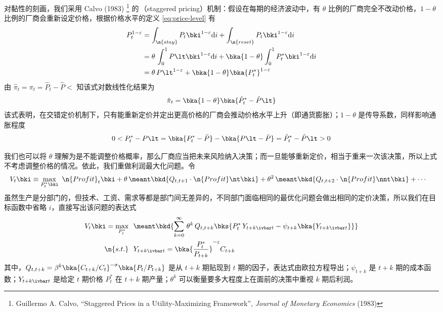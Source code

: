 对黏性的刻画，我们采用 Calvo (1983) \footnote{Guillermo A. Calvo, ``Staggered Prices in a Utility-Maximizing Framework'', \emph{Journal of Monetary Economics} (1983)} 的\,（staggered pricing）机制：假设在每期的经济波动中，有 \(\theta\) 比例的厂商完全不改动价格，\(1-\theta\) 比例的厂商会重新设定价格，根据价格水平的定义 \ref{eq:price-level} 有
\begin{align*}
    P_t^{1-\varepsilon}&=\int_{\n{stay}} P_t\bki^{1-\varepsilon}\mathrm di+\int_{\n{reset}} P_t\bki^{1-\varepsilon}\mathrm di\\&=\theta\,\int^1_0 P\lt\bki^{1-\varepsilon}\mathrm di+\bka{1-\theta}\int^1_0 P_t^*\bki^{1-\varepsilon}\mathrm di\\&=\theta\,P\lt^{1-\varepsilon}+\bka{1-\theta}\bka{P_t^*}^{1-\varepsilon}
\end{align*}
由 \(\hat\pi_t=\pi_t=\hat P_t-\hat P\lt\) 知该式对数线性化结果为
\begin{align*}
    \hat\pi_t=\bka{1-\theta}\bka{\hat P^*_t-\hat P\lt}
\end{align*}
该式表明，在交错定价机制下，只有能重新定价并定出更高价格的厂商会推动价格水平上升（即通货膨胀）；\(1-\theta\) 是传导系数，同样影响通胀程度
\begin{align*}
    0<P^*_t-P\lt=\bka{P^*_t-\bar P}-\bka{P\lt-\bar P}=\hat P^*_t-\hat P\lt>0
\end{align*}


我们也可以将 \(\theta\) 理解为是不能调整价格概率，那么厂商应当把未来风险纳入决策；而一旦能够重新定价，相当于重来一次该决策，所以上式不考虑调整价格的情况。依此，我们重做利润最大化问题。令
\begin{align*}
    V_t\bki &\equiv \max_{P_t^*\bki} \ \n{Profit}_t\bki+\theta\,\meant\bkd{Q_{t,t+1}\cdot\n{Profit}\nt\bki}+\theta^2\,\meant\bkd{Q_{t,t+2}\cdot\n{Profit}\nnt\bki}+\cdots
\end{align*}
虽然生产是分部门的，但技术、工资、需求等都是部门间无差异的，不同部门面临相同的最优化问题会做出相同的定价决策，所以我们在目标函数中省略 \(i\)，直接写出该问题的表达式
\begin{align*}
    V_t\bki=\max_{P_t^*}& \ \ \meant\bkd{\sum^\infty_{k=0}\,\theta^k\,Q_{t,t+k}\bks{P_t^*\, Y_{t+k\ivbar t}-\psi_{t+k}\bka{Y_{t+k\ivbar t}}}}\\
    \n{s.t.}& \ \ Y_{t+k\ivbar t}=\bka{\dfrac{P_t^*}{P_{t+k}}}^{-\varepsilon}C_{t+k}
\end{align*}
其中，\(Q_{t,t+k}=\beta^k\bka{C_{t+k}/C_t}^{-\sigma}\bka{P_t/P_{t+k}}\) 是从 \(t+k\) 期贴现到 \(t\) 期的因子，表达式由欧拉方程导出；\(\psi_{t+k}\) 是 \(t+k\) 期的成本函数；\(Y_{t+k\ivbar t}\) 是给定 \(t\) 期价格 \(P_t^*\) 在 \(t+k\) 期产量；\(\theta^k\) 可以衡量要多大程度上在面前的决策中重视 \(k\) 期后利润。

